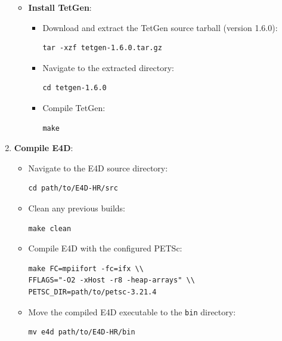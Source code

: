 \documentclass[a4paper,12pt]{article}
\begin{document}
\begin{enumerate}
\begin{itemize}
\begin{itemize}
                \end{itemize}
            \item \textbf{Install TetGen}:
                \begin{itemize}
                    \item Download and extract the TetGen source tarball (version 1.6.0):
                    \begin{verbatim}
tar -xzf tetgen-1.6.0.tar.gz
                    \end{verbatim}
                    \item Navigate to the extracted directory:
                    \begin{verbatim}
cd tetgen-1.6.0
                    \end{verbatim}
                    \item Compile TetGen:
                    \begin{verbatim}
make
                    \end{verbatim}
                \end{itemize}
        \end{itemize}

    \item \textbf{Compile E4D}:
        \begin{itemize}
            \item Navigate to the E4D source directory:
            \begin{verbatim}
cd path/to/E4D-HR/src
            \end{verbatim}
            \item Clean any previous builds:
            \begin{verbatim}
make clean
            \end{verbatim}
            \item Compile E4D with the configured PETSc:
            \begin{verbatim}
make FC=mpiifort -fc=ifx \\
FFLAGS="-O2 -xHost -r8 -heap-arrays" \\
PETSC_DIR=path/to/petsc-3.21.4
            \end{verbatim}
            \item Move the compiled E4D executable to the \texttt{bin} directory:
            \begin{verbatim}
mv e4d path/to/E4D-HR/bin
            \end{verbatim}
        \end{itemize}
\end{enumerate}
\end{document}
